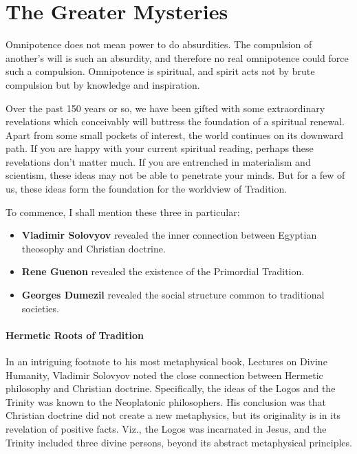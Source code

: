 \section{The Greater Mysteries}

\begin{quotex}
Omnipotence does not mean power to do absurdities. The compulsion of another's will is such an absurdity, and therefore no real omnipotence could force such a compulsion. Omnipotence is spiritual, and spirit acts not by brute compulsion but by knowledge and inspiration. 

\end{quotex}
Over the past 150 years or so, we have been gifted with some extraordinary revelations which conceivably will buttress the foundation of a spiritual renewal. Apart from some small pockets of interest, the world continues on its downward path. If you are happy with your current spiritual reading, perhaps these revelations don't matter much. If you are entrenched in materialism and scientism, these ideas may not be able to penetrate your minds. But for a few of us, these ideas form the foundation for the worldview of Tradition.

To commence, I shall mention these three in particular:

\begin{itemize}
\item \textbf{Vladimir Solovyov} revealed the inner connection between Egyptian theosophy and Christian doctrine. 
\item \textbf{Rene Guenon} revealed the existence of the Primordial Tradition. 
\item \textbf{Georges Dumezil} revealed the social structure common to traditional societies. 
\end{itemize}
\paragraph{Hermetic Roots of Tradition}
In an intriguing footnote to his most metaphysical book, Lectures on Divine Humanity, Vladimir Solovyov noted the close connection between Hermetic philosophy and Christian doctrine. Specifically, the ideas of the Logos and the Trinity was known to the Neoplatonic philosophers. His conclusion was that Christian doctrine did not create a new metaphysics, but its originality is in its revelation of positive facts. Viz., the Logos was incarnated in Jesus, and the Trinity included three divine persons, beyond its abstract metaphysical principles.

